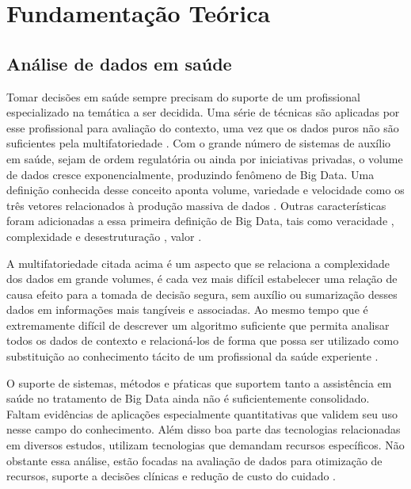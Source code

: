 
\chapter{Fundamentação Teórica}
\label{chap:fundamentacaoTeorica}

\section{Análise de dados em saúde}

Tomar decisões em saúde sempre precisam do suporte de um profissional especializado na temática a ser decidida. Uma série de técnicas são aplicadas por esse profissional para avaliação do contexto, uma vez que os dados puros não são suficientes pela multifatoriedade \cite{andrade_tomada_2008,resende2009}. Com o grande número de sistemas de auxílio em saúde, sejam de ordem regulatória ou ainda por iniciativas privadas, o volume de dados cresce exponencialmente, produzindo fenômeno de Big Data. Uma definição conhecida desse conceito aponta volume, variedade e velocidade como os três vetores relacionados à produção massiva de dados \cite{laney20013d}. Outras características foram adicionadas a essa primeira definição de Big Data, tais como veracidade \cite{schroeck2012analytics},  complexidade e desestruturação \cite{intel2012}, valor \cite{oracle2013}.

A multifatoriedade citada acima é um aspecto que se relaciona a complexidade dos dados em grande volumes, é cada vez mais difícil estabelecer uma relação de causa efeito para a tomada de decisão segura, sem auxílio ou sumarização desses dados em informações mais tangíveis e associadas. Ao mesmo tempo que é extremamente difícil de descrever um algoritmo suficiente que permita analisar todos os dados de contexto e relacioná-los de forma que possa ser utilizado como substituição ao conhecimento tácito de um profissional da saúde experiente \cite{faceli2011}.

O suporte de sistemas, métodos e pŕaticas que suportem tanto a assistência em saúde no tratamento de Big Data  ainda não é suficientemente consolidado. Faltam evidências de aplicações especialmente quantitativas que validem seu uso nesse campo do conhecimento. Além disso boa parte das tecnologias relacionadas em diversos estudos, utilizam tecnologias que demandam recursos específicos. Não obstante essa análise, estão focadas na avaliação de dados para otimização de recursos, suporte a decisões clínicas e redução de custo do cuidado \cite{nishita2018}.

